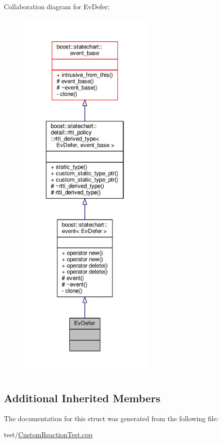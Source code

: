 Collaboration diagram for Ev\+Defer\+:
\nopagebreak
\begin{figure}[H]
\begin{center}
\leavevmode
\includegraphics[height=550pt]{struct_ev_defer__coll__graph}
\end{center}
\end{figure}
\subsection*{Additional Inherited Members}


The documentation for this struct was generated from the following file\+:\begin{DoxyCompactItemize}
\item 
test/\mbox{\hyperlink{_custom_reaction_test_8cpp}{Custom\+Reaction\+Test.\+cpp}}\end{DoxyCompactItemize}
